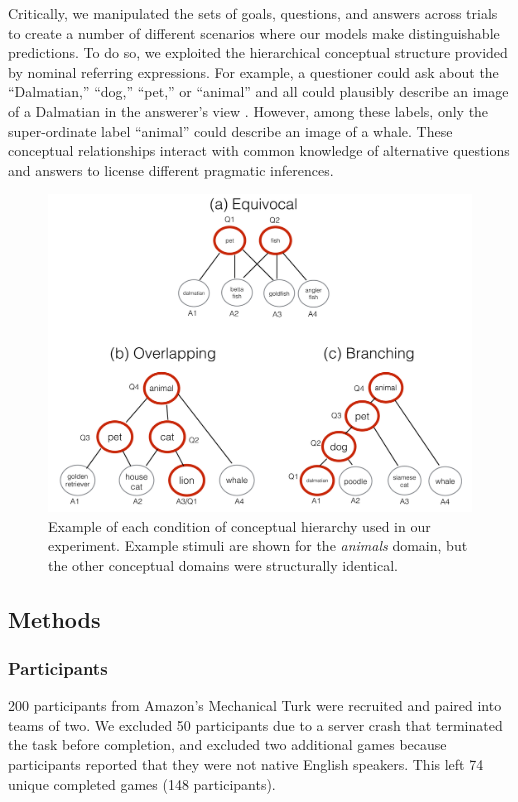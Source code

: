 \documentclass[11pt, floatsintext]{apa6}
\begin{document}
Critically, we manipulated the sets of goals, questions, and answers across trials to create a number of different scenarios where our models make distinguishable predictions.
To do so, we exploited the hierarchical conceptual structure provided by nominal referring expressions.
For example, a questioner could ask about the ``Dalmatian,'' ``dog,'' ``pet,'' or ``animal'' and all could plausibly describe an image of a Dalmatian in the answerer's view \cite{Brown58_HowShallAThingBeCalled,GrafEtAl16_BasicLevel}. 
However, among these labels, only the super-ordinate label ``animal'' could describe an image of a whale.
These conceptual relationships interact with common knowledge of alternative questions and answers to license different pragmatic inferences.

\begin{figure}[th!]
\begin{center}
\includegraphics[scale = .5]{Exp1/hierarchyStructureExamples.pdf}
\end{center}
\caption{\footnotesize  Example of each condition of conceptual hierarchy used in our experiment. Example stimuli are shown for the \emph{animals} domain, but the other conceptual domains were structurally identical.}
\label{fig:hierarchyStructures}
\end{figure}

\subsection{Methods}
\subsubsection{Participants} 
200 participants from Amazon's Mechanical Turk were recruited and paired into teams of two.
We excluded 50 participants due to a server crash that terminated the task before completion, and
excluded two additional games because participants reported that they were not native English speakers. 
This left 74 unique completed games (148 participants).
\end{document}

